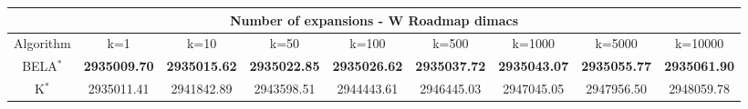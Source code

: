 \begin{tabular}{c|cccccccc}\toprule
\multicolumn{9}{c}{Number of expansions - W Roadmap dimacs}\\ \midrule
Algorithm & k=1 & k=10 & k=50 & k=100 & k=500 & k=1000 & k=5000 & k=10000 \\ \midrule
BELA$^*$ & \textbf{2935009.70} & \textbf{2935015.62} & \textbf{2935022.85} & \textbf{2935026.62} & \textbf{2935037.72} & \textbf{2935043.07} & \textbf{2935055.77} & \textbf{2935061.90} \\
K$^*$ & 2935011.41 & 2941842.89 & 2943598.51 & 2944443.61 & 2946445.03 & 2947045.05 & 2947956.50 & 2948059.78 \\ \bottomrule 
\end{tabular}
